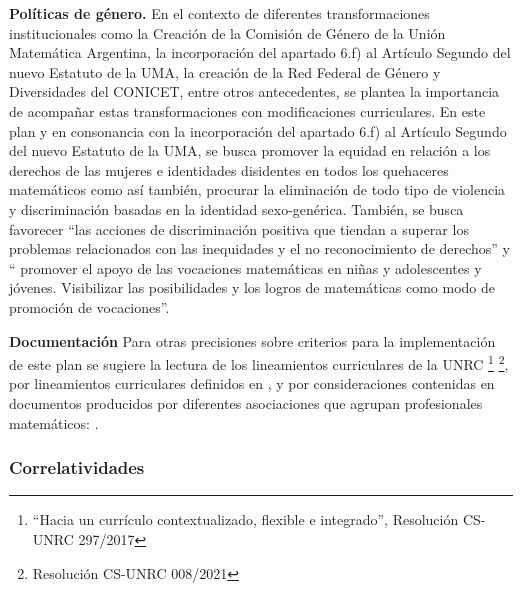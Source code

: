 \documentclass[a4paper, 12pt]{article}
\begin{document}
\begin{description}
\item{\textbf{Políticas de género.}}
En el contexto de diferentes transformaciones institucionales como la Creación de la Comisión de Género de la Unión Matemática Argentina, la incorporación del apartado 6.f) al Artículo Segundo del nuevo Estatuto de la UMA, la creación de la Red Federal de Género y Diversidades del CONICET, entre otros antecedentes, se plantea la importancia de acompañar estas transformaciones con  modificaciones curriculares. 
En este plan y en consonancia con la incorporación del apartado 6.f) al Artículo Segundo del nuevo Estatuto de la UMA, se  busca promover la equidad en relación a los derechos de las mujeres e identidades disidentes en todos los quehaceres matemáticos  como así también,  procurar la eliminación de todo tipo de violencia y discriminación basadas en la identidad sexo-genérica.
También, se busca favorecer “las acciones de discriminación positiva que tiendan a superar los problemas relacionados con las inequidades y el no reconocimiento de derechos”  y    “ promover el apoyo de las vocaciones matemáticas en niñas y adolescentes y jóvenes. Visibilizar las posibilidades y los logros de matemáticas como modo de promoción de vocaciones”.
 
 \item{\textbf{Documentación}} Para otras precisiones sobre criterios para la implementación de este plan se sugiere la lectura de los lineamientos curriculares de la UNRC \footnote{``Hacia   un   currículo contextualizado, flexible e integrado'', Resolución CS-UNRC 297/2017 }
\footnote{ Resolución CS-UNRC 008/2021}, por lineamientos curriculares definidos en  \cite{paniagua2013educacion}, y por consideraciones contenidas en documentos producidos por diferentes asociaciones que agrupan profesionales matemáticos: \cite{uma,society1996siam,society2012siam,damlamian2013educational}.

\end{description}




\subsubsection{Correlatividades}
 
\end{document}
